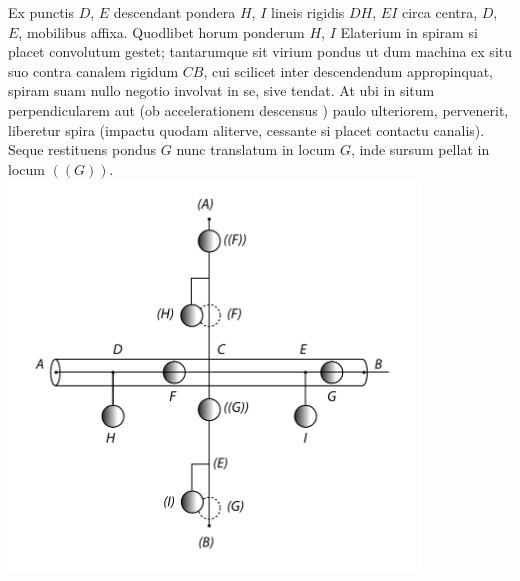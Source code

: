 \newline%
\hspace*{7,5mm}%
Ex punctis $D$, $E$ descendant pondera\protect{} $H$, $I$ lineis rigidis  $DH$, $EI$ circa centra, $D$, $E$, mobilibus affixa. Quod\-libet horum ponderum $H$, $I$ Elaterium\protect{} in spiram\protect{} si placet convolutum gestet; tantarumque sit virium pondus ut dum machina\protect{} ex situ   suo contra canalem rigidum $CB$, cui scilicet inter descendendum appropinquat, spiram suam nullo negotio involvat in se, sive tendat. At ubi in situm perpendicularem  aut (ob accelerationem\protect{} descensus ) paulo ulteriorem, pervenerit, liberetur spira (impactu quodam aliterve, cessante si placet contactu canalis).  Seque restituens pondus $G$ nunc translatum in locum $G$, inde sursum pellat in locum $((G))$. 
\pend 
\pstart
\centering
\includegraphics[trim = 0mm 6mm 0mm 5mm, clip, width=0.82\textwidth]{images/LH37,05_057r-d.pdf}\\
